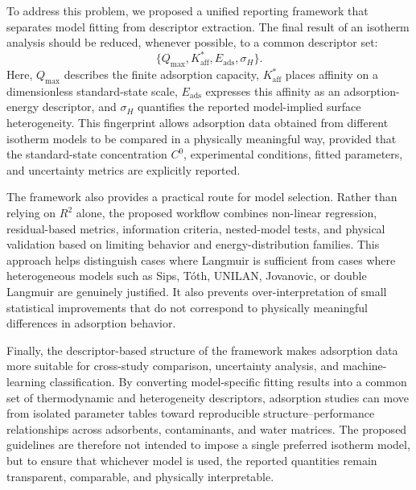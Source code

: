 \documentclass[journal=jacsat,manuscript=article]{achemso}
\begin{document}
	To address this problem, we proposed a unified reporting framework that separates model fitting from descriptor extraction. The final result of an isotherm analysis should be reduced, whenever possible, to a common descriptor set:
	\[
	\{Q_{\max}, K_{\mathrm{aff}}^{\ast}, E_{\mathrm{ads}}, \sigma_H\}.
	\]
	Here, \(Q_{\max}\) describes the finite adsorption capacity, \(K_{\mathrm{aff}}^{\ast}\) places affinity on a dimensionless standard-state scale, \(E_{\mathrm{ads}}\) expresses this affinity as an adsorption-energy descriptor, and \(\sigma_H\) quantifies the reported model-implied surface heterogeneity. This fingerprint allows adsorption data obtained from different isotherm models to be compared in a physically meaningful way, provided that the standard-state concentration \(C^0\), experimental conditions, fitted parameters, and uncertainty metrics are explicitly reported.
	
	The framework also provides a practical route for model selection. Rather than relying on \(R^2\) alone, the proposed workflow combines non-linear regression, residual-based metrics, information criteria, nested-model tests, and physical validation based on limiting behavior and energy-distribution families. This approach helps distinguish cases where Langmuir is sufficient from cases where heterogeneous models such as Sips, T\'{o}th, UNILAN, Jovanovic, or double Langmuir are genuinely justified. It also prevents over-interpretation of small statistical improvements that do not correspond to physically meaningful differences in adsorption behavior.
	
	Finally, the descriptor-based structure of the framework makes adsorption data more suitable for cross-study comparison, uncertainty analysis, and machine-learning classification. By converting model-specific fitting results into a common set of thermodynamic and heterogeneity descriptors, adsorption studies can move from isolated parameter tables toward reproducible structure--performance relationships across adsorbents, contaminants, and water matrices. The proposed guidelines are therefore not intended to impose a single preferred isotherm model, but to ensure that whichever model is used, the reported quantities remain transparent, comparable, and physically interpretable.

\end{document}
